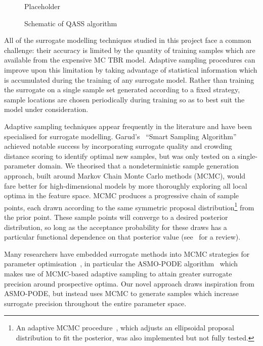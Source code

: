 \begin{figure}[h]
	\centering
	Placeholder %
	\caption{Schematic of QASS algorithm}
	\label{fig:qassplan}
\end{figure}

All of the surrogate modelling techniques studied in this project face a common
challenge: their accuracy is limited by the quantity of training samples which
are available from the expensive MC TBR model. Adaptive sampling procedures can
improve upon this limitation by taking advantage of statistical information
which is accumulated during the training of any surrogate model. Rather than
training the surrogate on a single sample set generated according to a fixed
strategy, sample locations are chosen periodically during training so as to best suit the model
under consideration.

Adaptive sampling techniques appear frequently in the literature and have been
specialised for surrogate modelling. Garud's~\cite{Garud2016} ``Smart Sampling
Algorithm'' achieved notable success by incorporating surrogate quality and
crowding distance scoring to identify optimal new samples, but was only tested
on a single-parameter domain. We theorised that a nondeterministic sample
generation approach, built around Markov Chain Monte Carlo methods (MCMC), would
fare better for high-dimensional models by more thoroughly exploring all local
optima in the feature space. MCMC produces a progressive chain of sample points,
each drawn according to the same symmetric proposal distribution\footnote{An
adaptive MCMC procedure~\cite{Zhang2012}, which adjusts an ellipsoidal proposal
distribution to fit the posterior, was also implemented but not fully tested.}
from the prior point. These sample points will converge to a desired posterior
distribution, so long as the acceptance probability for these draws has a
particular functional dependence on that posterior value (see~\cite{Zhou2018}
for a review).


Many researchers have embedded surrogate methods into MCMC strategies for
parameter optimisation~\cite{Zhang2020,Gong2017}, in particular the ASMO-PODE
algorithm~\cite{Ginting2011} which makes use of MCMC-based adaptive sampling to
attain greater surrogate precision around prospective optima. Our novel approach
draws inspiration from ASMO-PODE, but instead uses MCMC to generate samples
which increase surrogate precision throughout the entire parameter space.

